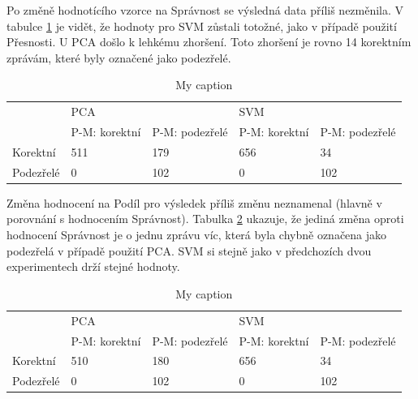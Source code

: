 \documentclass[thesis=M,czech]{FITthesis}[2012/10/20]
\begin{document}
			Po změně hodnotícího vzorce na Správnost se výsledná data příliš nezměnila. V tabulce \ref{table:anomaly_precision} je vidět, že hodnoty pro SVM zůstali totožné, jako v případě použití Přesnosti. U PCA došlo k lehkému zhoršení. Toto zhoršení je rovno 14 korektním zprávám, které byly označené jako podezřelé.
		
			\begin{table}[htb]\centering
				\centering
				\caption{My caption}
				\label{table:anomaly_precision}
				\begin{tabular}{|l|l|l|l|l|}
					\hline
					\multirow{2}{*}{} & \multicolumn{2}{l|}{PCA}                 & \multicolumn{2}{l|}{SVM}                 \\ 
					& P-M: korektní & P-M: podezřelé & P-M: korektní & P-M: podezřelé \\ \hline
					Korektní          & 511                & 179                 & 656                & 34                  \\ \hline
					Podezřelé         & 0                  & 102                 & 0                  & 102                 \\ \hline
				\end{tabular}
			\end{table}
		
			Změna hodnocení na Podíl pro výsledek příliš změnu neznamenal (hlavně v porovnání s hodnocením Správnost). Tabulka \ref{table:anomaly_recall} ukazuje, že jediná změna oproti hodnocení Správnost je o jednu zprávu víc, která byla chybně označena jako podezřelá v případě použití PCA. SVM si stejně jako v předchozích dvou experimentech drží stejné hodnoty.
			
			\begin{table}[htb]\centering
				\centering
				\caption{My caption}
				\label{table:anomaly_recall}
				\begin{tabular}{|l|l|l|l|l|}
					\hline
					\multirow{2}{*}{} & \multicolumn{2}{l|}{PCA}                 & \multicolumn{2}{l|}{SVM}                 \\ 
					& P-M: korektní & P-M: podezřelé & P-M: korektní & P-M: podezřelé \\ \hline
					Korektní          & 510                & 180                 & 656                & 34                  \\ \hline
					Podezřelé         & 0                  & 102                 & 0                  & 102                 \\ \hline
				\end{tabular}
			\end{table}
		
\end{document}
